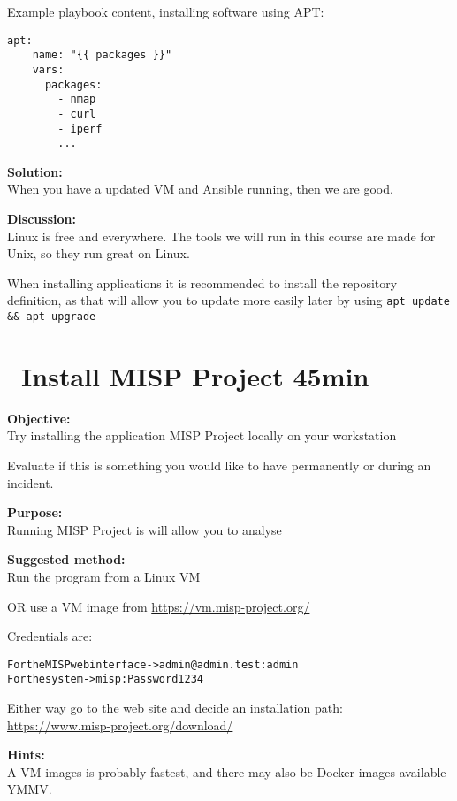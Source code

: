 \documentclass[a4paper,11pt,notitlepage]{report}
\begin{document}
Example playbook content, installing software using APT:
\begin{verbatim}
apt:
    name: "{{ packages }}"
    vars:
      packages:
        - nmap
        - curl
        - iperf
        ...
\end{verbatim}

{\bf Solution:}\\
When you have a updated VM and Ansible running, then we are good.

{\bf Discussion:}\\
Linux is free and everywhere. The tools we will run in this course are made for Unix, so they run great on Linux.

When installing applications it is recommended to install the repository definition, as that will allow you to update more easily later by using \verb+apt update && apt upgrade+




\chapter{\faInfoCircle\ Install MISP Project 45min}
\label{ex:misp-install}


{\bf Objective:}\\
Try installing the application MISP Project locally on your workstation

Evaluate if this is something you would like to have permanently or during an incident.

{\bf Purpose:}\\
Running MISP Project is  will allow you to analyse

{\bf Suggested method:}\\
Run the program from a Linux VM

OR use a VM image from \url{https://vm.misp-project.org/}

Credentials are:
\begin{alltt}\footnotesize
For the MISP web interface -> admin@admin.test:admin
For the system -> misp:Password1234
\end{alltt}

Either way go to the web site and decide an installation path:\\
\url{https://www.misp-project.org/download/}

{\bf Hints:}\\
A VM images is probably fastest, and there may also be Docker images available YMMV.
\end{document}
